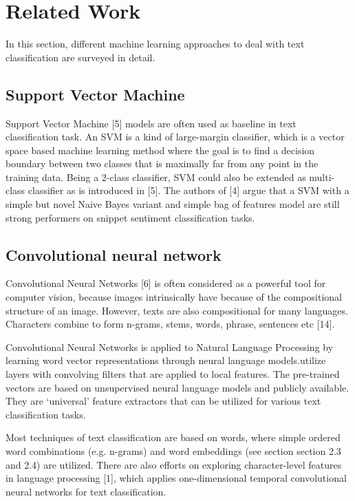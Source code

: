 \documentclass{article}
\begin{document}
\section{Related Work}
In this section, different machine learning approaches to deal with text classification are surveyed in detail. 

\subsection{Support Vector Machine}

Support Vector Machine [5] models are often used as baseline in text classification task.  An SVM is a kind of large-margin classifier, which is a vector space based machine learning method where the goal is to find a decision boundary between two classes that is maximally far from any point in the training data. Being a 2-class classifier, SVM could also be extended as multi-class classifier as is introduced in [5].  The authors of [4] argue that a SVM with a simple but novel Naive Bayes variant and simple bag of features model are still strong performers on snippet sentiment classification tasks.


\subsection{Convolutional neural network}
Convolutional Neural Networks [6] is often considered as a powerful tool for computer vision, because images intrinsically  have  because of the compositional structure of an image. However, texts are also compositional for many languages. Characters combine to form n-grams, stems, words, phrase, sentences etc [14]. 

Convolutional Neural Networks is applied to Natural Language Processing by learning word vector representations through neural language models.utilize layers with convolving filters that are applied to local features. The pre-trained vectors are based on unsupervised neural language models and publicly available. They are `universal' feature extractors that can be utilized for various text classification tasks.

Most techniques of text classification are based on words, where simple ordered word combinations (e.g. n-grams) and word embeddings (see section section 2.3 and 2.4) are utilized. There are also efforts on exploring character-level features in language processing [1], which applies one-dimensional temporal  convolutional neural networks for text classification.
\end{document}
